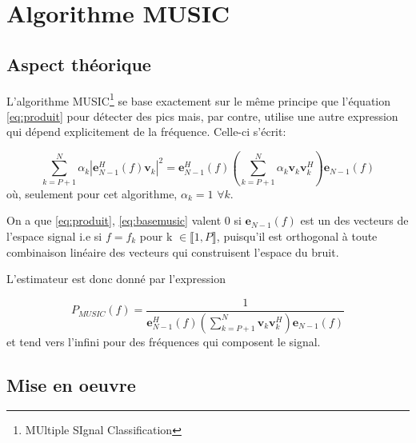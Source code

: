 \documentclass{article}
\begin{document}
\newpage














\section{Algorithme MUSIC}

\subsection{Aspect théorique}

L'algorithme MUSIC\footnote{MUltiple SIgnal Classification} se base exactement sur le même principe que l'équation \ref{eq:produit} pour détecter des pics mais, par contre, utilise une autre expression qui dépend explicitement de la fréquence. Celle-ci s'écrit:

\begin{equation}
%
    \label{eq:basemusic}
    \sum_{k=P+1}^{N} \alpha _k \left| \boldsymbol{e}_{N-1}^H (f) \boldsymbol{v}_k \right| ^2 = \boldsymbol{e}_{N-1}^H (f) \left( \sum_{k=P+1}^{N} \alpha _k  \boldsymbol{v}_{k}\boldsymbol{v}_k^H \right) \boldsymbol{e}_{N-1} (f)
%
\end{equation}
%
où, seulement pour cet algorithme, \( \alpha _k = 1 \) \(\forall k\). 

\vspace*{10pt}

On a que \ref{eq:produit}, \ref{eq:basemusic} valent 0 si \(\boldsymbol{e}_{N-1}(f)\) est un des vecteurs de l'espace signal i.e si \( f = f_k \) pour k \( \in \llbracket 1,P\rrbracket \), puisqu'il est orthogonal à toute combinaison linéaire des vecteurs qui construisent l'espace du bruit.

L'estimateur est donc donné par l'expression

\begin{equation}
%
    \label{eq:music}
    P_{MUSIC} (f) = \frac{1}{\boldsymbol{e}_{N-1}^H (f) \left( \sum_{k=P+1}^{N}   \boldsymbol{v}_{k}\boldsymbol{v}_k^H \right) \boldsymbol{e}_{N-1} (f)}
%
\end{equation}
  et tend vers l'infini pour des fréquences qui composent le signal.

\vspace*{10pt}

\subsection{Mise en oeuvre}
\label{miseenouvre}
\end{document}

